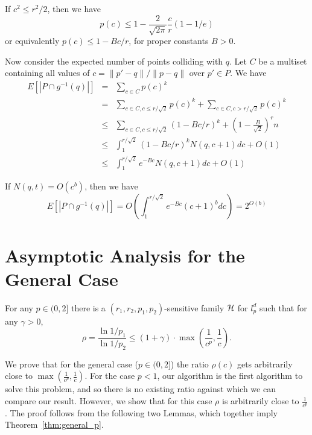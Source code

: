 \documentclass[12pt]{article}
\begin{document}
If $c^2 \le r^2/2$, then we have 
\[  p(c) \le 1- \frac{2}{\sqrt{2 \pi}}\frac{c}{r} (1-1/e) \]
or equivalently $p(c) \le 1-B c/r$, for proper constants $B>0$.



Now consider the expected number of points colliding with $q$.
Let $C$ be a multiset containing all values of $c=\|p'-q\|/\|p-q\|$ over $p' \in P$.
We have
\begin{eqnarray*}
E[|P \cap g^{-1}(q)|] & = & \sum_{c \in C} p(c)^k\\
& = &  \sum_{c \in C, c \le r/\sqrt{2}} p(c)^k +  \sum_{c \in C, c > r/\sqrt{2}} p(c)^k\\
& \le &  \sum_{c \in C, c \le r/\sqrt{2}} (1- B c/r)^k + (1- \frac{B}{\sqrt{2}})^r n\\
& \le  & \int_1^{r/\sqrt{2}} (1-B c/r)^k N(q,c+1) dc + O(1)\\
& \le  & \int_1^{r/\sqrt{2}} e^{-Bc} N(q,c+1) dc + O(1)
\end{eqnarray*}

If $N(q,t)=O(c^b)$, then we have 
\[ E[|P \cap g^{-1}(q)|] =  O \left (\int_1^{r/\sqrt{2}} e^{-Bc} (c+1)^b dc\right ) = 2^{O(b)} \]  



\section{Asymptotic Analysis for the General Case}


\begin{theorem}
\label{thm:general_p}
For any $p \in (0,2]$ there is a $(r_1,r_2,p_1,p_2)$-sensitive family
${\cal H}$ for $l_p^d$ such that for any $\gamma > 0$,
$$\rho=\frac{\ln 1/p_1}{\ln 1/p_2} \le (1+\gamma)\cdot\max\left(\frac{1}{c^p}, \frac{1}{c}\right).$$
\end{theorem}


We prove that for the general case ($p \in (0,2]$) the ratio $\rho(c)$
gets arbitrarily close to $\max\left(\frac{1}{c^p},
\frac{1}{c}\right)$.
For the case $p<1$, our algorithm is the
first algorithm to solve this problem, and so there is no existing ratio
against which we can compare our result.  However, we show that for this
case $\rho$ is arbitrarily close to $\frac{1}{c^p}$.
The proof follows from the
following two Lemmas, which together imply Theorem~\ref{thm:general_p}.
\end{document}
